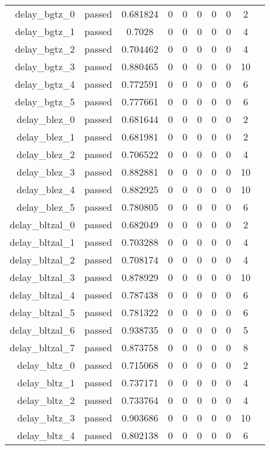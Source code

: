 \begin{longtable}{r|ccccccccc}
    delay\_bgtz\_0 & passed & 0.681824 & 0 & 0 & 0 & 0 & 0 & 2 \\
    delay\_bgtz\_1 & passed & 0.7028 & 0 & 0 & 0 & 0 & 0 & 4 \\
    delay\_bgtz\_2 & passed & 0.704462 & 0 & 0 & 0 & 0 & 0 & 4 \\
    delay\_bgtz\_3 & passed & 0.880465 & 0 & 0 & 0 & 0 & 0 & 10 \\
    delay\_bgtz\_4 & passed & 0.772591 & 0 & 0 & 0 & 0 & 0 & 6 \\
    delay\_bgtz\_5 & passed & 0.777661 & 0 & 0 & 0 & 0 & 0 & 6 \\
    delay\_blez\_0 & passed & 0.681644 & 0 & 0 & 0 & 0 & 0 & 2 \\
    delay\_blez\_1 & passed & 0.681981 & 0 & 0 & 0 & 0 & 0 & 2 \\
    delay\_blez\_2 & passed & 0.706522 & 0 & 0 & 0 & 0 & 0 & 4 \\
    delay\_blez\_3 & passed & 0.882881 & 0 & 0 & 0 & 0 & 0 & 10 \\
    delay\_blez\_4 & passed & 0.882925 & 0 & 0 & 0 & 0 & 0 & 10 \\
    delay\_blez\_5 & passed & 0.780805 & 0 & 0 & 0 & 0 & 0 & 6 \\
    delay\_bltzal\_0 & passed & 0.682049 & 0 & 0 & 0 & 0 & 0 & 2 \\
    delay\_bltzal\_1 & passed & 0.703288 & 0 & 0 & 0 & 0 & 0 & 4 \\
    delay\_bltzal\_2 & passed & 0.708174 & 0 & 0 & 0 & 0 & 0 & 4 \\
    delay\_bltzal\_3 & passed & 0.878929 & 0 & 0 & 0 & 0 & 0 & 10 \\
    delay\_bltzal\_4 & passed & 0.787438 & 0 & 0 & 0 & 0 & 0 & 6 \\
    delay\_bltzal\_5 & passed & 0.781322 & 0 & 0 & 0 & 0 & 0 & 6 \\
    delay\_bltzal\_6 & passed & 0.938735 & 0 & 0 & 0 & 0 & 0 & 5 \\
    delay\_bltzal\_7 & passed & 0.873758 & 0 & 0 & 0 & 0 & 0 & 8 \\
    delay\_bltz\_0 & passed & 0.715068 & 0 & 0 & 0 & 0 & 0 & 2 \\
    delay\_bltz\_1 & passed & 0.737171 & 0 & 0 & 0 & 0 & 0 & 4 \\
    delay\_bltz\_2 & passed & 0.733764 & 0 & 0 & 0 & 0 & 0 & 4 \\
    delay\_bltz\_3 & passed & 0.903686 & 0 & 0 & 0 & 0 & 0 & 10 \\
    delay\_bltz\_4 & passed & 0.802138 & 0 & 0 & 0 & 0 & 0 & 6 \\

\end{longtable}
